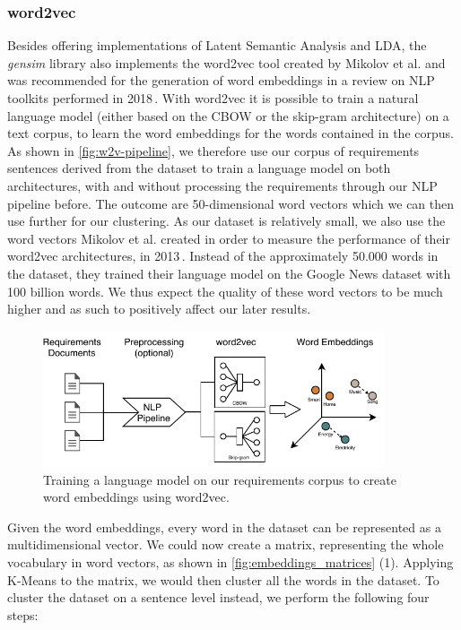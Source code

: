 \subsubsection{word2vec} %
\label{sub:own_word2vec}
Besides offering implementations of Latent Semantic Analysis and LDA, the \textit{gensim} library also implements the word2vec tool created by Mikolov et al. and was recommended for the generation of word embeddings in a review on NLP toolkits performed in 2018\,\cite{solangi_review_2018}. With word2vec it is possible to train a natural language model (either based on the CBOW or the skip-gram architecture) on a text corpus, to learn the word embeddings for the words contained in the corpus. As shown in \autoref{fig:w2v-pipeline}, we therefore use our corpus of requirements sentences derived from the \crowdre{} dataset to train a language model on both architectures, with and without processing the requirements through our NLP pipeline before. The outcome are 50-dimensional word vectors which we can then use further for our clustering. As our dataset is relatively small, we also use the word vectors Mikolov et al. created in order to measure the performance of their word2vec architectures, in 2013\,\cite{mikolov_efficient_2013}. Instead of the approximately 50.000 words in the \crowdre{} dataset, they trained their language model on the Google News dataset with 100 billion words. We thus expect the quality of these word vectors to be much higher and as such to positively affect our later results.
\begin{figure}[ht]
  \begin{center}
    \includegraphics[width=0.9\textwidth]{figures/word2vec_pipeline.pdf}
    \caption{Training a language model on our requirements corpus to create word embeddings using word2vec.}
    \label{fig:w2v-pipeline}
  \end{center}
\end{figure}
\FloatBarrier

Given the word embeddings, every word in the \crowdre{} dataset can be represented as a multidimensional vector. We could now create a matrix, representing the whole vocabulary in word vectors, as shown in \autoref{fig:embeddings_matrices} (1). Applying K-Means to the matrix, we would then cluster all the words in the dataset. To cluster the dataset on a sentence level instead, we perform the following four steps:

